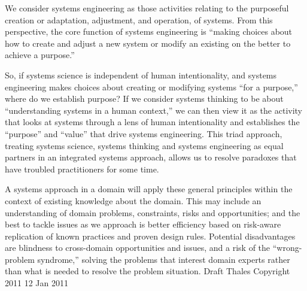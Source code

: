 We consider systems engineering as those activities relating to the purposeful creation or adaptation, adjustment, and operation, of systems. From this perspective, the core function of systems engineering is ``making choices about how to create and adjust a new system or modify an existing on the better to achieve a purpose.''

So, if systems science is independent of human intentionality, and systems engineering makes choices about creating or modifying systems ``for a purpose,'' where do we establish purpose?  If we consider systems thinking to be about ``understanding systems in a human context,'' we can then view it as the activity that looks at systems through a lens of human intentionality and establishes the ``purpose'' and ``value'' that drive systems engineering. This triad approach, treating systems science, systems thinking and systems engineering as equal partners in an integrated systems approach, allows us to resolve paradoxes that have troubled practitioners for some time.

A systems approach in a domain will apply these general principles within the context of existing knowledge about the domain. This may include an understanding of domain problems, constraints, risks and opportunities; and the best to tackle issues as we approach is better efficiency based on risk-aware replication of known practices and proven design rules. Potential disadvantages are blindness to cross-domain opportunities and issues, and a risk of the ``wrong-problem syndrome,'' solving the problems that interest domain experts rather than what is needed to resolve the problem situation. Draft Thales Copyright 2011 12 Jan 2011

